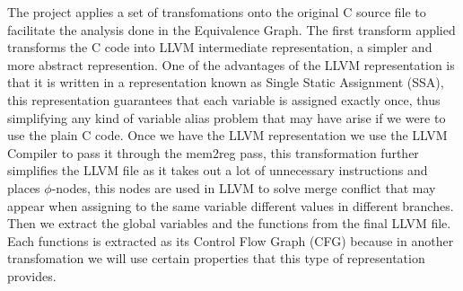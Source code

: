 \documentclass{article}
\begin{document}
The project applies a set of transfomations onto the original C source file to facilitate the analysis done in the Equivalence Graph.
The first transform applied transforms the C code into LLVM intermediate representation, a simpler and more abstract represention.
One of the advantages of the LLVM representation is that it is written in a representation known as Single Static Assignment (SSA),
this representation guarantees that each variable is assigned exactly once, thus simplifying any kind of variable alias problem that may have arise if we were to use
the plain C code.
Once we have the LLVM representation we use the LLVM Compiler to pass it through the mem2reg pass, this transformation further simplifies the LLVM file
as it takes out a lot of unnecessary instructions and places $\phi$-nodes, this nodes are used in LLVM to solve merge conflict that may appear when assigning
to the same variable different values in different branches.
Then we extract the global variables and the functions from the final LLVM file. Each functions is extracted as its Control Flow Graph (CFG)
because in another transfomation we will use certain properties that this type of representation provides.
\end{document}
